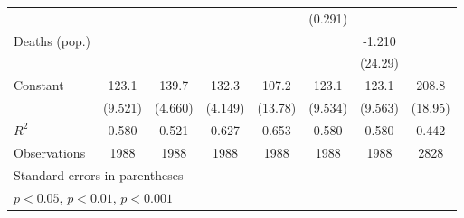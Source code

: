 \documentclass{article}
\begin{document}
{\begin{longtable}{l*{7}{c}}
                &                  &                  &                  &                  &  (0.291)         &                  &                  \\
Deaths (pop.)   &                  &                  &                  &                  &                  &   -1.210         &                  \\
                &                  &                  &                  &                  &                  &  (24.29)         &                  \\
Constant        &    123.1\sym{***}&    139.7\sym{***}&    132.3\sym{***}&    107.2\sym{***}&    123.1\sym{***}&    123.1\sym{***}&    208.8\sym{***}\\
                &  (9.521)         &  (4.660)         &  (4.149)         &  (13.78)         &  (9.534)         &  (9.563)         &  (18.95)         \\
\hline
\(R^{2}\)       &    0.580         &    0.521         &    0.627         &    0.653         &    0.580         &    0.580         &    0.442         \\
Observations    &     1988         &     1988         &     1988         &     1988         &     1988         &     1988         &     2828         \\
\hline\hline
\multicolumn{8}{l}{\footnotesize Standard errors in parentheses}\\
\multicolumn{8}{l}{\footnotesize \sym{*} \(p<0.05\), \sym{**} \(p<0.01\), \sym{***} \(p<0.001\)}\\
\end{longtable}
}
\end{document}
